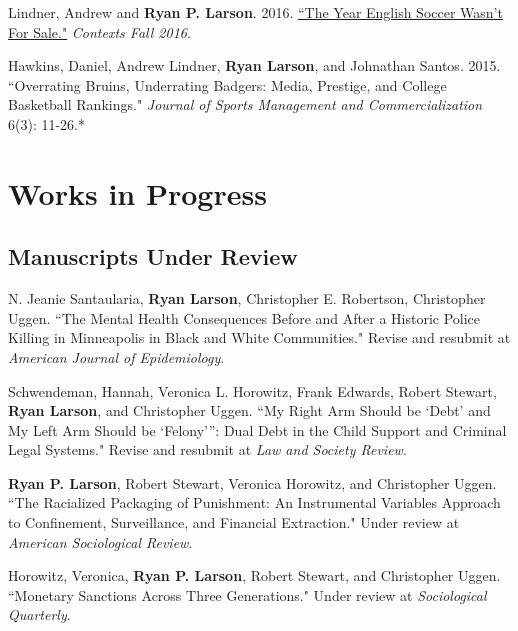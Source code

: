 \documentclass[letterpaper]{article}
\renewenvironment{itemize}{
  \begin{list}{}{
    \setlength{\leftmargin}{1.5em}
  }
}{
  \end{list}
}
\begin{document}
\begin{itemize}
\item Lindner, Andrew and \textbf{Ryan P. Larson}. 2016. \href{http://journals.sagepub.com/doi/full/10.1177/1536504216685127}{``The Year English Soccer Wasn't For Sale."} \textit{Contexts Fall 2016}. 

\item Hawkins, Daniel, Andrew Lindner, \textbf{Ryan Larson}, and Johnathan Santos. 2015. ``Overrating Bruins, Underrating Badgers: Media, Prestige, and College Basketball Rankings." \textit{Journal of Sports Management and Commercialization} 6(3): 11-26.*

\end{itemize}

\section*{\textbf{Works in Progress}}

\subsection*{Manuscripts Under Review}
\begin{itemize}

\item N. Jeanie Santaularia, \textbf{Ryan Larson}, Christopher E. Robertson, Christopher Uggen. ``The Mental Health Consequences Before and After a Historic Police Killing in Minneapolis in Black and White Communities." Revise and resubmit at \textit{American Journal of Epidemiology}. 

\item Schwendeman, Hannah, Veronica L. Horowitz, Frank Edwards, Robert Stewart,  \textbf{Ryan Larson}, and Christopher Uggen. ``My Right Arm Should be ‘Debt’ and My Left Arm Should be ‘Felony’”: Dual Debt in the Child Support and Criminal Legal Systems." Revise and resubmit at \textit{Law and Society Review}. 

\item \textbf{Ryan P. Larson}, Robert Stewart, Veronica Horowitz, and Christopher Uggen. ``The Racialized Packaging of Punishment: An Instrumental Variables Approach to Confinement, Surveillance, and Financial Extraction." Under review at \textit{American Sociological Review}.

\item Horowitz, Veronica, \textbf{Ryan P. Larson}, Robert Stewart, and Christopher Uggen. ``Monetary Sanctions Across Three Generations." Under review at \textit{Sociological Quarterly}.


\end{itemize}
\end{document}
